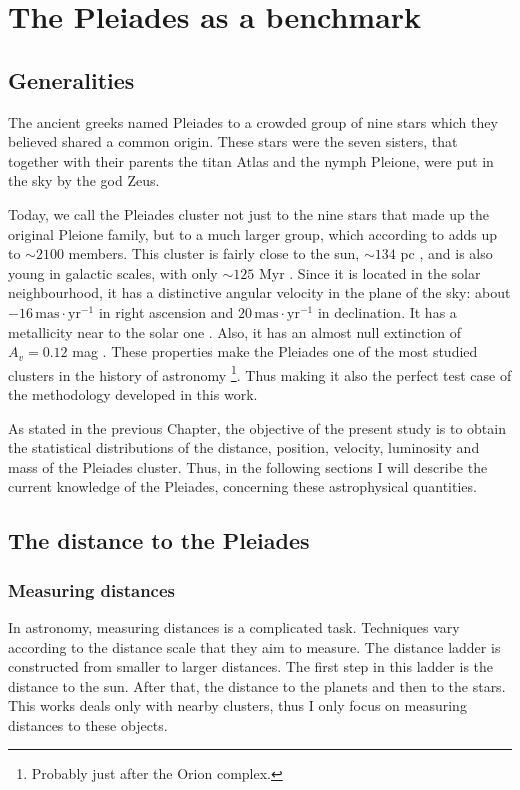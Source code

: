 \chapter{The Pleiades as a benchmark}
\label{chap:pleiades}

\section{Generalities}
\label{sect:generalities}
The ancient greeks named Pleiades to a crowded group of nine stars which they believed shared a common origin. These stars were the seven sisters, that together with their parents the titan Atlas and the nymph Pleione, were put in the sky  by the god Zeus.
 
Today, we call the Pleiades cluster not just to the nine stars that made up the original Pleione family, but to a much larger group, which according to \citet{Bouy2015} adds up to $\sim2100$ members. This cluster is fairly close to the sun, $\sim 134$ pc \cite[with parallaxes of $7.44\pm0.08$ and $7.48\pm0.03$ according to][respectively]{Galli2017,2017A&A...601A..19G}, and is also young in galactic scales, with only $\sim125$ Myr \citep{Stauffer1998}. Since it is located in the solar neighbourhood, it has a distinctive angular velocity in the plane of the sky: about $-16\,\mathrm{mas\cdot yr^{-1}}$ in right ascension and $20\,\mathrm{mas\cdot yr^{-1}}$ in declination. It has a metallicity near to the solar one \cite[{[Fe/H]$\sim$0},][]{Takeda2017}. Also, it has an almost null extinction of $A_v=0.12$ mag \citep{Guthrie1987}. These properties make the Pleiades one of the most studied clusters in the history of astronomy \footnote{Probably just after the Orion complex.}. Thus making it also the perfect test case of the methodology developed in this work.

As stated in the previous Chapter,  the objective of the present study is to obtain the statistical distributions of the distance, position, velocity, luminosity and mass of the Pleiades cluster. Thus, in the following sections I will describe the current knowledge of the Pleiades, concerning these astrophysical quantities. 
 
\section{The distance to the Pleiades}

\subsection{Measuring distances}
In astronomy, measuring distances is a complicated task. Techniques vary according to the distance scale that they aim to measure. The distance ladder is constructed from smaller to larger distances. The first step in this ladder is the distance to the sun. After that, the distance to the planets and then to the stars. This works deals only with nearby clusters, thus I only focus on measuring distances to these objects. 

